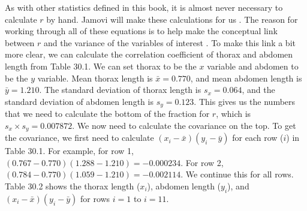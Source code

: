 \documentclass[
  openany]{krantz}
\begin{document}
As with other statistics defined in this book, it is almost never necessary to calculate \(r\) by hand.
Jamovi will make these calculations for us \citep{Jamovi2022}.
The reason for working through all of these equations is to help make the conceptual link between \(r\) and the variance of the variables of interest \citep{Rodgers1988}.
To make this link a bit more clear, we can calculate the correlation coefficient of thorax and abdomen length from Table 30.1.
We can set thorax to be the \(x\) variable and abdomen to be the \(y\) variable.
Mean thorax length is \(\bar{x} = 0.770\), and mean abdomen length is \(\bar{y} = 1.210\).
The standard deviation of thorax length is \(s_{x} = 0.064\), and the standard deviation of abdomen length is \(s_{y} = 0.123\).
This gives us the numbers that we need to calculate the bottom of the fraction for \(r\), which is \(s_{x} \times s_{y} = 0.007872\).
We now need to calculate the covariance on the top.
To get the covariance, we first need to calculate \(\left(x_{i} - \bar{x} \right) \left(y_{i} - \bar{y} \right)\) for each row (\(i\)) in Table 30.1.
For example, for row 1, \(\left(0.767 - 0.770\right) \left(1.288 - 1.210\right) = -0.000234.\)
For row 2, \(\left(0.784 - 0.770\right) \left(1.059 - 1.210\right) = -0.002114.\)
We continue this for all rows.
Table 30.2 shows the thorax length (\(x_{i}\)), abdomen length (\(y_{i}\)), and \(\left(x_{i} - \bar{x} \right) \left(y_{i} - \bar{y} \right)\) for rows \(i = 1\) to \(i = 11\).
\end{document}
